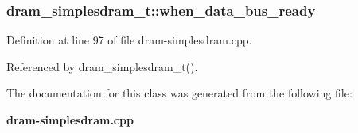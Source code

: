 \subsubsection[{when\_\-data\_\-bus\_\-ready}]{ {\bf dram\_\-simplesdram\_\-t::when\_\-data\_\-bus\_\-ready}\hspace{0.3cm}{\tt  [protected]}}\label{classdram__simplesdram__t_59cc66ac28a70a8dba4306a7c401575d}




Definition at line 97 of file dram-simplesdram.cpp.

Referenced by dram\_\-simplesdram\_\-t().

The documentation for this class was generated from the following file:\begin{CompactItemize}
\item 
{\bf dram-simplesdram.cpp}\end{CompactItemize}
